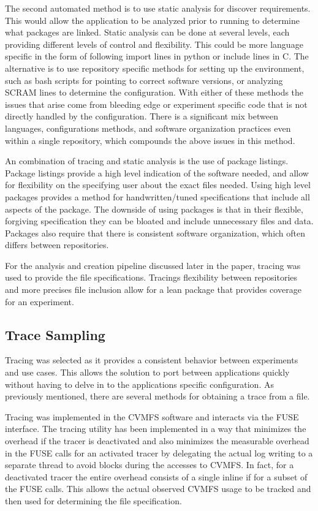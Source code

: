 \documentclass[conference]{IEEEtran}
\begin{document}
The second automated method is to use static
analysis for discover requirements.
This would allow the application to be analyzed
prior to running to determine what packages are
linked.
Static analysis can be done at several levels,
each providing different levels of control 
and flexibility.
This could be more language specific in the 
form of following import lines in python or
include lines in C.
The alternative is to use repository specific 
methods for setting up the environment,
such as bash scripts for pointing to correct 
software versions, or 
analyzing SCRAM\cite{DBLP:journals/corr/cs-OH-0306014} lines
to determine the configuration.
With either of these methods the issues
that arise come from bleeding edge or
experiment specific code that is not directly
handled by the configuration.
There is a significant mix between languages,
configurations methods, and software organization
practices even within a single repository,
which compounds the above issues in this method.

An combination of tracing and static analysis is the
use of package listings. 
Package listings provide a high level indication
of the software needed, and allow for 
flexibility on the specifying user about the
exact files needed.
Using high level packages provides a method
for handwritten/tuned specifications that 
include all aspects of the package.
The downside of using packages is that in
their flexible, forgiving specification
they can be bloated and include unnecessary
files and data.
Packages also require that there is consistent
software organization, which often differs
between repositories.

For the analysis and creation pipeline discussed
later in the paper, tracing was used to provide
the file specifications. 
Tracings flexibility between repositories
and more precises file inclusion allow
for a lean package that provides coverage for
an experiment.

\subsection{Trace Sampling}
Tracing was selected as it provides a consistent 
behavior between experiments and use cases.
This allows the solution to port between applications
quickly without having to delve in to the applications
specific configuration.
As previously mentioned, there are several methods for
obtaining a trace from a file.

Tracing was implemented in the CVMFS software and
interacts via the FUSE interface.
The tracing utility has been implemented in a way that 
minimizes the overhead if the tracer is deactivated and 
also minimizes the measurable overhead in the FUSE calls for an activated tracer 
by delegating the actual log writing to a separate thread to avoid blocks 
during the accesses to CVMFS. 
In fact, for a deactivated tracer the entire overhead consists of 
a single inline if for a subset of the FUSE calls.
This allows the actual observed CVMFS usage to  be tracked
and then used for determining the file specification.
\end{document}
